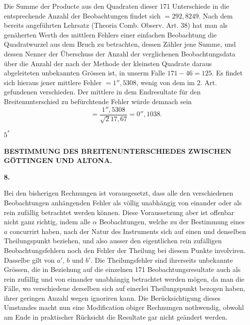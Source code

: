 Die Summe der Producte aus den Quadraten dieser 171 Unterschiede in
die entsprechende Anzahl der Beobachtungen findet sich \(=292{,}8249\). Nach
dem bereits angeführten Lehrsatz (Theoria Comb. Observ. Art. 38) hat man
als genäherten Werth des mittlern Fehlers einer einfachen Beobachtung die
Quadratwurzel aus dem Bruch zu betrachten, dessen Zähler jene Summe, und
dessen Nenner der Überschuss der Anzahl der verglichenen Beobachtungsdata
über die Anzahl der nach der Methode der kleinsten Quadrate daraus
abgeleiteten unbekannten Grössen ist, in unserm Falle \(171-46=125\). Es findet
sich hieraus jener mittlere Fehler \(=1''{,}5308\), wenig von dem im 2. Art.
gefundenen verschieden. Der mittlere in dem Endresultate für den
Breitenunterschied zu befürchtende Fehler würde demnach sein
\[
=\frac{1''{,}5308}{\surd 217{,}67}=0''{,}1038.
\]
\par\vfill
\noindent\hfill \(5^{*}\)\hspace{.12\textwidth}\par

\par\clearpage
\noindent{}\parbox[t]{\dimexpr\linewidth-24mm\relax}{\centering\scriptsize\bfseries BESTIMMUNG DES BREITENUNTERSCHIEDES ZWISCHEN GÖTTINGEN UND ALTONA.}\makebox[12mm][r]{}\par\medskip

\begin{center}\textbf{8.}\end{center}

Bei den bisherigen Rechnungen ist vorausgesetzt, dass alle den verschiedenen
Beobachtungen anhängenden Fehler als völlig unabhängig von einander
oder als rein zufällig betrachtet werden können. Diese Voraussetzung aber
ist offenbar nicht ganz richtig, indem alle \(\alpha\) Beobachtungen, welche zu der
Bestimmung eines \(a\) concurrirt haben, nach der Natur des Instruments sich
auf einen und denselben Theilungspunkt beziehen, und also ausser den
eigentlichen rein zufälligen Beobachtungsfehlern noch den Fehler der Theilung bei
diesem Punkte involviren. Dasselbe gilt von \(a'\), \(b\) und \(b'\). Die
Theilungsfehler sind ihrerseits unbekannte Grössen, die in Beziehung auf die einzelnen
171 Beobachtungsresultate auch als rein zufällig und von einander unabhängig
betrachtet werden mögen, da man die Fälle, wo verschiedene derselben sich
auf einerlei Theilungspunkt bezogen haben, ihrer geringen Anzahl wegen
ignoriren kann. Die Berücksichtigung dieses Umstandes macht nun eine
Modification obiger Rechnungen nothwendig, obwohl am Ende in praktischer
Rücksicht die Resultate gar nicht geändert werden.

